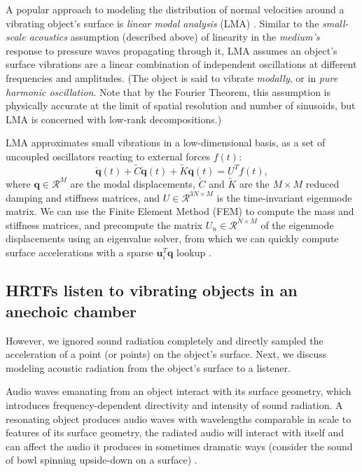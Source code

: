 \documentclass[12pt]{article}
\newcommand{\vct}[1]{\mathbf{#1}}
\begin{document}
A popular approach to modeling the distribution of normal velocities around a vibrating object's surface is \textit{linear modal analysis} (LMA) \cite{cook_sound_production_2002, shabana_vibration_2012, starch_perimetry_1908}.
Similar to the \textit{small-scale acoustics} assumption (described above) of linearity in the \textit{medium's} response to pressure waves propagating through it, LMA assumes an object's surface vibrations are a linear combination of independent oscillations at different frequencies and amplitudes.
(The object is said to vibrate \textit{modally}, or in \textit{pure harmonic oscillation}.
Note that by the Fourier Theorem, this assumption is physically accurate at the limit of spatial resolution and number of sinusoids, but LMA is concerned with low-rank decompositions.)

LMA approximates small vibrations in a low-dimensional basis, as a set of uncoupled oscillators reacting to external forces $f(t)$:
$$\vct{\ddot{q}}(t) + \tilde{C} \vct{\dot{q}}(t) + \tilde{K} \vct{q}(t) = U^T f(t),$$
where $\vct{q} \in \mathcal{R}^M$ are the modal displacements, $\tilde{C}$ and $\tilde{K}$ are the $M \times M$ reduced damping and stiffness matrices, and $U \in \mathcal{R}^{3 N \times M}$ is the time-invariant eigenmode matrix.
We can use the Finite Element Method (FEM) to compute the mass and stiffness matrices, and precompute the matrix $U_n \in \mathcal{R}^{N \times M}$ of the eigenmode displacements using an eigenvalue solver, from which we can quickly compute surface accelerations with a sparse $\vct{u}_i^T \vct{q}$ lookup \cite{wang_wbss_2018}.

\subsection{HRTFs listen to vibrating objects in an anechoic chamber}

However, we ignored sound radiation completely and directly sampled the acceleration of a point (or points) on the object's surface.
Next, we discuss modeling acoustic radiation from the object's surface to a listener.

Audio waves emanating from an object interact with its surface geometry, which introduces frequency-dependent directivity and intensity of sound radiation.
A resonating object produces audio waves with wavelengths comparable in scale to features of its surface geometry, the radiated audio will interact with itself and can affect the audio it produces in sometimes dramatic ways (consider the sound of bowl spinning upside-down on a surface) \cite{wang_kleinpat_2019}.
\end{document}
